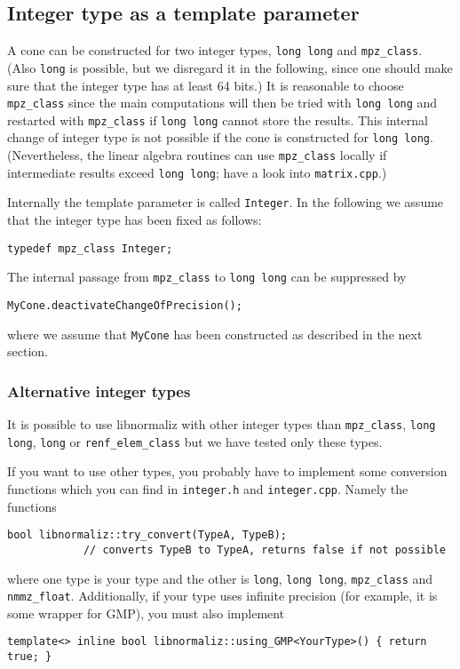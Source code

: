 \documentclass[12pt,a4paper]{scrartcl}
\theoremstyle{definition}
\begin{document}
\begin{small}
\subsection{Integer type as a template parameter}

A cone can be constructed for two integer types, \verb|long long| and \verb|mpz_class|. (Also \verb|long| is possible, but we disregard it in the following, since one should make sure that the integer type has at least 64 bits.) It is reasonable to choose \verb|mpz_class| since the main computations will then be tried with \verb|long long| and restarted with \verb|mpz_class| if \verb|long long| cannot store the results. This internal change of integer type is not possible if the cone is constructed for \verb|long long|. (Nevertheless, the linear algebra routines can use \verb|mpz_class| locally if intermediate results exceed \verb|long long|; have a look into \verb|matrix.cpp|.)

Internally the template parameter is called \verb|Integer|. In the following we assume that the integer type has been fixed as follows:
\begin{Verbatim}
typedef mpz_class Integer;
\end{Verbatim}

The internal passage from \verb|mpz_class| to \verb|long long| can be suppressed by
\begin{Verbatim}
MyCone.deactivateChangeOfPrecision();
\end{Verbatim}
where we assume that \verb|MyCone| has been constructed as described in the next section.

\subsubsection{Alternative integer types}

It is possible to use libnormaliz with other integer types than \verb|mpz_class|,  \verb|long long|, \verb|long| or \verb|renf_elem_class| but we have tested only these types.

If you want to use other types, you probably have to implement some conversion functions which you can find in \verb|integer.h| and \verb|integer.cpp|. Namely the functions
\begin{Verbatim}
bool libnormaliz::try_convert(TypeA, TypeB); 
            // converts TypeB to TypeA, returns false if not possible
\end{Verbatim}
where one type is your type and the other is \verb|long|, \verb|long long|, \verb|mpz_class| and \verb|nmmz_float|.
Additionally, if your type uses infinite precision (for example, it is some wrapper for GMP), you must also implement
\begin{Verbatim}
template<> inline bool libnormaliz::using_GMP<YourType>() { return true; }
\end{Verbatim}


\end{small}
\end{document}
